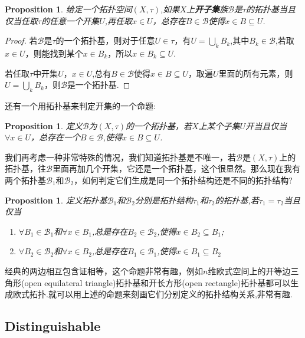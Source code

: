 \documentclass{article}
\newtheorem{proposition}[theorem]{Proposition}
\begin{document}
\begin{proposition}
给定一个拓扑空间$(X,\tau)$,如果$X$上\textbf{开子集}族$\mathscr{B}$是$\tau$的拓扑基当且仅当任取$\tau$的任意一个开集$U$,再任取$x \in U$，总存在$B \in \mathscr{B}$使得$x \in B \subseteq U$.
\end{proposition}

\begin{proof}
若$\mathscr{B}$是$\tau$的一个拓扑基，则对于任意$U \in \tau$，有$U = \bigcup\limits_k B_k$,其中$B_k \in \mathscr{B}$,若取$x \in U$，则能找到某个$x \in B_k$，所以$x \in B_k \subseteq U$.

若任取$\tau$中开集$U$，$x \in U$,总有$B \in \mathscr{B}$使得$x \in B \subseteq U$，取遍$U$里面的所有元素，则$U = \bigcup\limits_k B_k$，则$\mathscr{B}$是一个拓扑基.
\end{proof}

还有一个用拓扑基来判定开集的一个命题:

\begin{proposition}
定义$\mathscr{B}$为$(X,\tau)$的一个拓扑基，若$X$上某个子集$U$开当且仅当$\forall x \in U$，总存在一个$B \in \mathscr{B}$,使得$x \in B \subseteq U$.
\end{proposition}

我们再考虑一种非常特殊的情况，我们知道拓扑基是不唯一，若$\mathscr{B}$是$(X,\tau)$上的拓扑基，往$\mathscr{B}$里面再加几个开集，它还是一个拓扑基，这个很显然。那么现在我有两个拓扑基$\mathscr{B}_1$和$\mathscr{B}_2$，如何判定它们生成是同一个拓扑结构还是不同的拓扑结构?

\begin{proposition}
定义拓扑基$\mathscr{B}_1$和$\mathscr{B}_2$分别是拓扑结构$\tau_1$和$\tau_2$的拓扑基,若$\tau_1 = \tau_2$当且仅当
\begin{enumerate}
	\item $\forall B_1 \in \mathscr{B}_1$和$\forall x \in B_1$,总是存在$B_2 \in \mathscr{B}_2$,使得$x \in B_2 \subseteq B_1$;
	\item $\forall B_2 \in \mathscr{B}_2$和$\forall x \in B_2$,总是存在$B_1 \in \mathscr{B}_1$,使得$x \in B_1 \subseteq B_2$
\end{enumerate}
\end{proposition}

经典的两边相互包含证相等，这个命题非常有趣，例如$n$维欧式空间上的开等边三角形(open equilateral triangle)拓扑基和开长方形(open  rectangle)拓扑基都可以生成欧式拓扑.就可以用上述的命题来刻画它们分别定义的拓扑结构关系,非常有趣.

\newpage

\subsection{Distinguishable}
\end{document}
